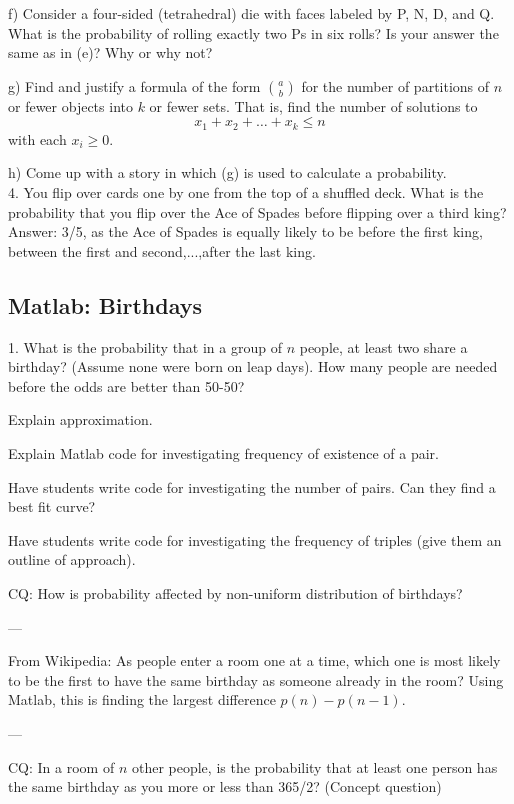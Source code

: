 \documentclass[12pt]{article}
\begin{document}
f) Consider a four-sided (tetrahedral) die with faces labeled by P, N, D, and Q.  What is the probability of rolling exactly two Ps in six rolls?  Is your answer the same as in (e)?  Why or why not?

g) Find and justify a formula of the form $\binom{a}{b}$ for the number of partitions of $n$ or fewer objects into $k$ or fewer sets.  That is, find the number of solutions to $$x_1 + x_2 + \dots + x_k \leq n$$ with each $x_i \geq 0$.

h) Come up with a story in which (g) is used to calculate a probability. \\

4. You flip over cards one by one from the top of a shuffled deck.  What is the probability that you flip over the Ace of Spades before flipping over a third king? \\
Answer: 3/5, as the Ace of Spades is equally likely to be before the first king, between the first and second,...,after the last king.


\subsection{Matlab: Birthdays}

1. What is the probability that in a group of $n$ people, at least two share a birthday?  (Assume none were born on leap days).  How many people are needed before the odds are better than 50-50?

Explain approximation.

Explain Matlab code for investigating frequency of existence of a pair.

Have students write code for investigating the number of pairs.  Can they find a best fit curve?

Have students write code for investigating the frequency of triples (give them an outline of approach).

CQ: How is probability affected by non-uniform distribution of birthdays?

---

From Wikipedia: As people enter a room one at a time, which one is most likely to be the first to have the same birthday as someone already in the room?  Using Matlab, this is finding the largest difference $p(n) - p(n-1)$.

---

CQ: In a room of $n$ other people, is the probability that at least one person has the same birthday as you more or less than 365/2? (Concept question)
\end{document}
